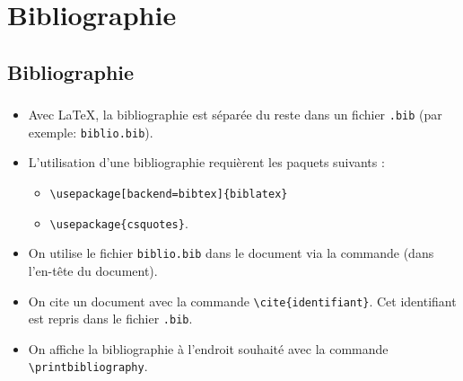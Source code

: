 \section{Bibliographie}

\subsection{Bibliographie}

\begin{frame}[fragile]
  \frametitle{\insertsubsection}
  \begin{itemize}
    \item Avec \LaTeX{}, la bibliographie est séparée du reste dans un fichier \texttt{.bib} (par exemple: \texttt{biblio.bib}).
    \item L'utilisation d'une bibliographie requièrent les paquets suivants :
    \begin{itemize}
    \item \lstinline|\usepackage[backend=bibtex]{biblatex}|
    \item \lstinline|\usepackage{csquotes}|.
    \end{itemize}
    \item On utilise le fichier \texttt{biblio.bib} dans le document via la commande \lstinline|| (dans l'en-tête du document).
    \item On cite un document avec la commande \lstinline|\cite{identifiant}|. Cet identifiant est repris dans le fichier \texttt{.bib}.
    \item On affiche la bibliographie à l'endroit souhaité avec la commande \lstinline|\printbibliography|.
  \end{itemize}
\end{frame}

